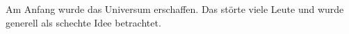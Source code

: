 Am Anfang wurde das Universum erschaffen. Das störte viele Leute und wurde
generell als schechte Idee betrachtet.